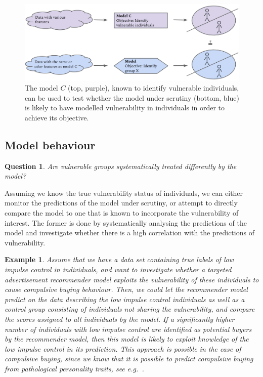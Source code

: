 \documentclass[11pt,theapa]{article}
\theoremstyle{plain}
\newtheorem{question}{Question}
\newtheorem{case}{Example}
\begin{document}
\begin{figure}
    \centering
    \includegraphics[width=0.7\columnwidth]{model_comparison.png}
    \caption{\label{fig:two_models} The model $C$ (top, purple), known to identify vulnerable individuals, can be used to test whether the model under scrutiny (bottom, blue) is likely to have modelled vulnerability in individuals in order to achieve its objective.}
\end{figure}

\subsection{Model behaviour}
\begin{question}
    Are vulnerable groups systematically treated differently by the model?
\end{question}
Assuming we know the true vulnerability status of individuals, we can either monitor the predictions of the model under scrutiny, or attempt to directly compare the model to one that is known to incorporate the vulnerability of interest. The former is done by systematically analysing the predictions of the model and investigate whether there is a high correlation with the predictions of vulnerability. 
\begin{case}
Assume that we have a data set containing true labels of low impulse control in individuals, and want to investigate whether a targeted advertisement recommender model exploits the vulnerability of these individuals to cause compulsive buying behaviour. Then, we could let the recommender model predict on the data describing the low impulse control individuals as well as a control group consisting of individuals not sharing the vulnerability, and compare the scores assigned to all individuals by the model. If a significantly higher number of individuals with low impulse control are identified as potential buyers by the recommender model, then this model is likely to exploit knowledge of the low impulse control in its prediction. This approach is possible in the case of compulsive buying, since we know that it is possible to predict compulsive buying from pathological personality traits, see e.g.~\cite{Harnish2021}.
\end{case}
\end{document}
